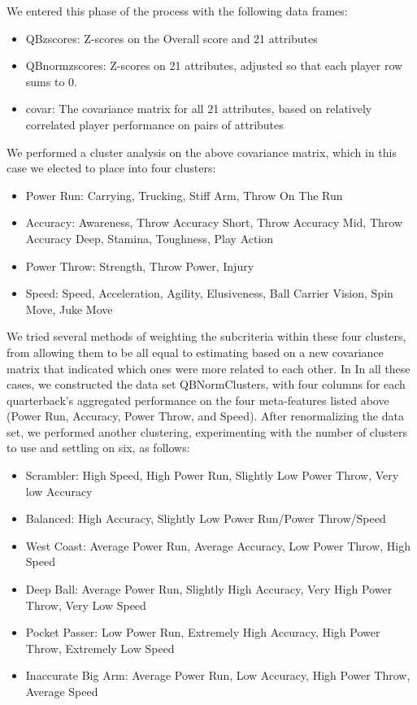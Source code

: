 \documentclass[12pt]{article}
\begin{document}
We entered this phase of the process with the following data frames:
\begin{itemize}
	\item{QBzscores}: Z-scores on the Overall score and 21 attributes
	\item{QBnormzscores}: Z-scores on 21 attributes, adjusted so that each player row sums to 0.
	\item{covar}: The covariance matrix for all 21 attributes, based on relatively correlated player performance on pairs of attributes
\end{itemize}

We performed a cluster analysis on the above covariance matrix, which in this case we elected to place into four clusters:

\begin{itemize}
	\item {Power Run}: Carrying, Trucking, Stiff Arm, Throw On The Run
	\item {Accuracy}: Awareness, Throw Accuracy Short, Throw Accuracy Mid, Throw Accuracy Deep, Stamina, Toughness, Play Action
	\item {Power Throw}: Strength, Throw Power, Injury
	\item {Speed}: Speed, Acceleration, Agility, Elusiveness, Ball Carrier Vision, Spin Move, Juke Move
\end{itemize}

We tried several methods of weighting the subcriteria within these four clusters, from allowing them to be all equal to estimating based on a new covariance matrix that indicated which ones were more related to each other. In 
In all these cases, we constructed the data set QBNormClusters, with four columns for each quarterback's aggregated performance on the four meta-features listed above (Power Run, Accuracy, Power Throw, and Speed). 
After renormalizing the data set, we performed another clustering, experimenting with the number of clusters to use and settling on six, as follows:

\begin{itemize}
	\item Scrambler: High Speed, High Power Run, Slightly Low Power Throw, Very low Accuracy
	\item Balanced: High Accuracy, Slightly Low Power Run/Power Throw/Speed
	\item West Coast: Average Power Run, Average Accuracy, Low Power Throw, High Speed
	\item Deep Ball: Average Power Run, Slightly High Accuracy, Very High Power Throw, Very Low Speed
	\item Pocket Passer: Low Power Run, Extremely High Accuracy, High Power Throw, Extremely Low Speed
	\item Inaccurate Big Arm: Average Power Run, Low Accuracy, High Power Throw, Average Speed
\end{itemize}
\end{document}
